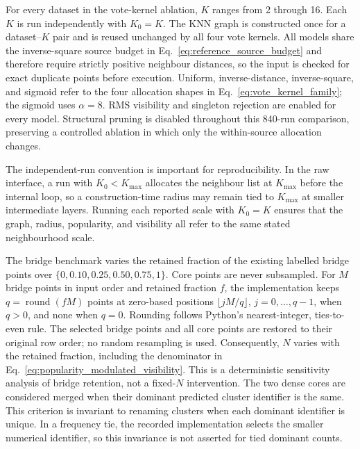 \documentclass[pdflatex,sn-basic,Numbered]{sn-jnl}
\begin{document}
For every dataset in the vote-kernel ablation, $K$ ranges from 2 through 16. Each $K$ is run independently with $K_0=K$. The KNN graph is constructed once for a dataset--$K$ pair and is reused unchanged by all four vote kernels. All models share the inverse-square source budget in Eq.~\eqref{eq:reference_source_budget} and therefore require strictly positive neighbour distances, so the input is checked for exact duplicate points before execution. Uniform, inverse-distance, inverse-square, and sigmoid refer to the four allocation shapes in Eq.~\eqref{eq:vote_kernel_family}; the sigmoid uses $\alpha=8$. RMS visibility and singleton rejection are enabled for every model. Structural pruning is disabled throughout this 840-run comparison, preserving a controlled ablation in which only the within-source allocation changes.

The independent-run convention is important for reproducibility. In the raw
interface, a run with $K_0<K_{\max}$ allocates the neighbour list at
$K_{\max}$ before the internal loop, so a construction-time radius may remain
tied to $K_{\max}$ at smaller intermediate layers. Running each reported scale
with $K_0=K$ ensures that the graph, radius, popularity, and visibility all
refer to the same stated neighbourhood scale.

The bridge benchmark varies the retained fraction of the existing labelled
bridge points over $\{0,0.10,0.25,0.50,0.75,1\}$. Core points are never
subsampled. For $M$ bridge points in input order and retained fraction $f$,
the implementation keeps $q=\operatorname{round}(fM)$ points at zero-based
positions $\lfloor jM/q\rfloor$, $j=0,\ldots,q-1$, when $q>0$, and none
when $q=0$. Rounding follows Python's nearest-integer, ties-to-even rule.
The selected bridge points and all core points are restored to their original
row order; no random resampling is used. Consequently, $N$ varies with the
retained fraction, including the denominator in
Eq.~\eqref{eq:popularity_modulated_visibility}. This is a deterministic
sensitivity analysis of bridge retention, not a fixed-$N$ intervention.
The two dense cores are considered merged when their dominant predicted
cluster identifier is the same. This criterion is invariant to renaming
clusters when each dominant identifier is unique. In a frequency tie, the
recorded implementation selects the smaller numerical identifier, so this
invariance is not asserted for tied dominant counts.
\end{document}
